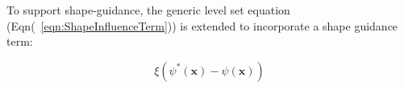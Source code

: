 \documentclass{InsightArticle}
\begin{document}
To support shape-guidance, the generic level set equation
(Eqn(~\ref{eqn:ShapeInfluenceTerm})) is extended to incorporate a shape guidance
term:

\begin{equation}
\label{eqn:ShapeInfluenceTerm}
\xi \left(\psi^{*}(\mathbf{x}) - \psi(\mathbf{x})\right)
\end{equation}




%
%



\end{document}
